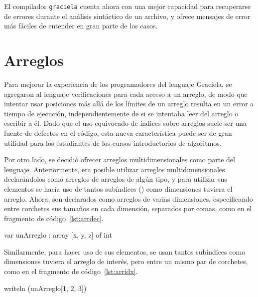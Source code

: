 El compilador \texttt{graciela} cuenta ahora con una mejor capacidad para
recuperarse de errores durante el análisis sintáctico de un archivo, y ofrece
mensajes de error más fáciles de entender en gran parte de los casos.

\section{Arreglos}

Para mejorar la experiencia de los programadores del lenguaje Graciela, se
agregaron al lenguaje verificaciones para cada acceso a un arreglo, de modo que
intentar usar posiciones más allá de los límites de un arreglo resulta en un
error a tiempo de ejecución, independientemente de si se intentaba leer del
arreglo o escribir a él. Dado que el uso equivocado de índices sobre arreglos
suele ser una fuente de defectos en el código, esta nueva característica puede
ser de gran utilidad para los estudiantes de los cursos introductorios de
algoritmos.

Por otro lado, se decidió ofrecer arreglos multidimensionales como parte del
lenguaje. Anteriormente, era posible utilizar arreglos multidimensionales
declarándolos como arreglos de arreglos de algún tipo, y para utilizar sus
elementos se hacía uso de tantos subíndices (\ingra{[i]}) como dimensiones
tuviera el arreglo. Ahora, son declarados como arreglos de varias dimensiones,
especificando entre corchetes sus tamaños en cada dimensión, separados por
comas, como en el fragmento de código~\ref{lst:arrdec}.

\begin{gracielacode}[caption=Declaración de variable de tipo arreglo, label=lst:arrdec]
var unArreglo : array [x, y, z] of int
\end{gracielacode}

Similarmente, para hacer uso de sus elementos, se usan tantos subíndices como
dimensiones tuviera el arreglo de interés, pero entre un mismo par de corchetes,
como en el fragmento de código~\ref{lst:arridx}.

\begin{gracielacode}[caption=Acceso a variable de tipo arreglo, label=lst:arridx]
writeln (unArreglo[1, 2, 3])
\end{gracielacode}

